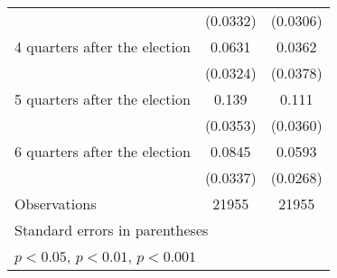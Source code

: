 \begin{table}[htbp]
\begin{tabular}{l*{2}{c}}
                    &    (0.0332)         &    (0.0306)         \\
[1em]
 4 quarters after the election&      0.0631         &      0.0362         \\
                    &    (0.0324)         &    (0.0378)         \\
[1em]
 5 quarters after the election&       0.139\sym{***}&       0.111\sym{**} \\
                    &    (0.0353)         &    (0.0360)         \\
[1em]
 6 quarters after the election&      0.0845\sym{*}  &      0.0593\sym{*}  \\
                    &    (0.0337)         &    (0.0268)         \\
\hline
Observations        &       21955         &       21955         \\
\hline\hline
\multicolumn{3}{l}{\footnotesize Standard errors in parentheses}\\
\multicolumn{3}{l}{\footnotesize \sym{*} \(p<0.05\), \sym{**} \(p<0.01\), \sym{***} \(p<0.001\)}\\
\end{tabular}
\end{table}
